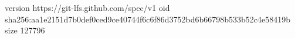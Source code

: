 version https://git-lfs.github.com/spec/v1
oid sha256:aa1e2151d7b0def0ced9ce40744f6c6f86d3752bd6b66798b533b52c4e58419b
size 127796
